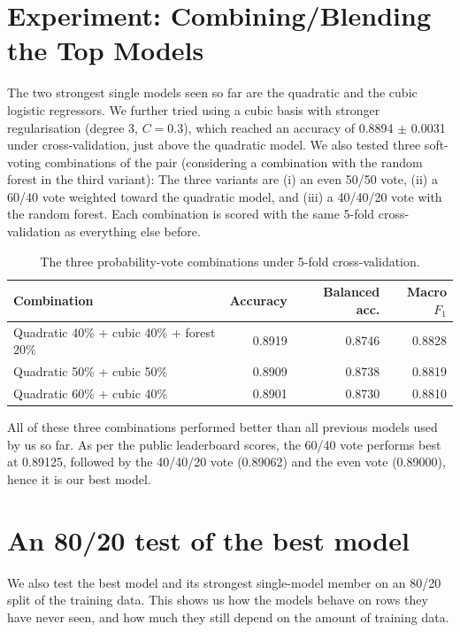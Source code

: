\documentclass[11pt]{article}
\begin{document}
\section{Experiment: Combining/Blending the Top Models}

The two strongest single models seen so far are the quadratic and the cubic logistic regressors. We further tried using a cubic basis with stronger regularisation (degree 3, $C=0.3$), which reached an accuracy of 0.8894 $\pm$ 0.0031 under cross-validation, just above the quadratic model. We also tested three soft-voting combinations of the pair (considering a combination with the random forest in the third variant): The three variants are (i) an even 50/50 vote, (ii) a 60/40 vote weighted toward the quadratic model, and (iii) a 40/40/20 vote with the random forest. Each combination is scored with the same 5-fold cross-validation as everything else before.

\begin{table}[H]
\centering
\small
\setlength{\tabcolsep}{6pt}
\begin{tabular}{@{}>{\raggedright\arraybackslash}p{6.2cm}rrr@{}}
\toprule
Combination & Accuracy & Balanced acc. & Macro $F_1$ \\
\midrule
Quadratic 40\% + cubic 40\% + forest 20\% & 0.8919 & 0.8746 & 0.8828 \\
Quadratic 50\% + cubic 50\% & 0.8909 & 0.8738 & 0.8819 \\
Quadratic 60\% + cubic 40\% & 0.8901 & 0.8730 & 0.8810 \\
\bottomrule
\end{tabular}
\caption{The three probability-vote combinations under 5-fold cross-validation.}
\label{tab:machvotes}
\end{table}

All of these three combinations performed better than all previous models used by us so far. As per the public leaderboard scores, the 60/40 vote performs best at 0.89125, followed by the 40/40/20 vote (0.89062) and the even vote (0.89000), hence it is our best model.

\section{An 80/20 test of the best model}

We also test the best model and its strongest single-model member on an 80/20 split of the training data. This shows us how the models behave on rows they have never seen, and how much they still depend on the amount of training data.
\end{document}
